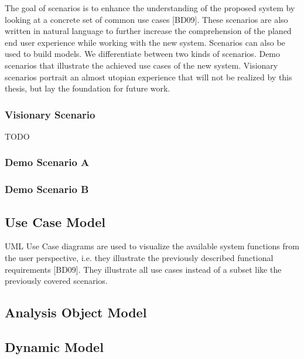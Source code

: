 The goal of scenarios is to enhance the understanding of the proposed system by looking at a concrete set of common use cases [BD09].
These scenarios are also written in natural language to further increase the comprehension of the planed end user experience while working with the new system.
Scenarios can also be used to build models. We differentiate between two kinds of scenarios.
Demo scenarios that illustrate the achieved use cases of the new system.
Visionary scenarios portrait an almost utopian experience that will not be realized by this thesis, but lay the foundation for future work.

\subsubsection{Visionary Scenario}
TODO
\subsubsection{Demo Scenario A}

\subsubsection{Demo Scenario B}

\subsection{Use Case Model}
UML Use Case diagrams are used to visualize the available system functions from the user perspective, i.e. they illustrate the previously described functional requirements [BD09].
They illustrate all use cases instead of a subset like the previously covered scenarios.

\subsection{Analysis Object Model}
\subsection{Dynamic Model}
